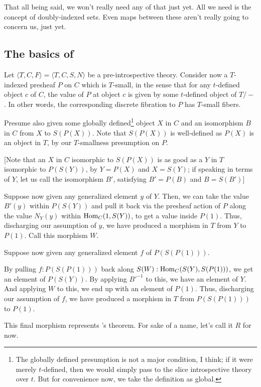 That all being said, we won't really need any of that just yet. All we need is the concept of doubly-indexed sets. Even maps between these aren't really going to concern us, just yet.

\subsection{The basics of \Loeb}
Let $\langle T, C, F \rangle = \langle T, C, S, N \rangle$ be a pre-introspective theory. Consider now a $T$-indexed presheaf $P$ on $C$ which is $T$-small, in the sense that for any $t$-defined object $c$ of $C$, the value of $P$ at object $c$ is given by some $t$-defined object of $T/-$. In other words, the corresponding discrete fibration to $P$ has $T$-small fibers.

Presume also given some globally defined\footnote{The globally defined presumption is not a major condition, I think; if it were merely $t$-defined, then we would simply pass to the slice introspective theory over $t$. But for convenience now, we take the definition as global. } object $X$ in $C$ and an isomorphism $B$ in $C$ from $X$ to $S(P(X))$. Note that $S(P(X))$ is well-defined as $P(X)$ is an object in $T$, by our $T$-smallness presumption on $P$.

[Note that an $X$ in $C$ isomorphic to $S(P(X))$ is as good as a $Y$ in $T$ isomorphic to $P(S(Y))$, by $Y = P(X)$ and $X = S(Y)$; if speaking in terms of $Y$, let us call the isomorphism $B'$, satisfying $B' = P(B)$ and $B = S(B')$]

Suppose now given any generalized element $y$ of $Y$. Then, we can take the value $B'(y)$ within $P(S(Y))$ and pull it back via the presheaf action of $P$ along the value $N_Y(y)$ within $\operatorname{Hom}_C(1, S(Y))$, to get a value inside $P(1)$. Thus, discharging our assumption of $y$, we have produced a morphism in $T$ from $Y$ to $P(1)$. Call this morphism $W$.

Suppose now given any generalized element $f$ of $P(S(P(1)))$.

By pulling $f :P(S(P(1)))$ back along $S(W) : \operatorname{Hom}_C(S(Y), S(P(1)))$, we get an element of $P(S(Y))$. By applying $B'^{-1}$ to this, we have an element of $Y$. And applying $W$ to this, we end up with an element of $P(1)$. Thus, discharging our assumption of $f$, we have produced a morphism in $T$ from $P(S(P(1)))$ to $P(1)$.

This final morphism represents \Loeb's theorem. For sake of a name, let's call it $R$ for now.

